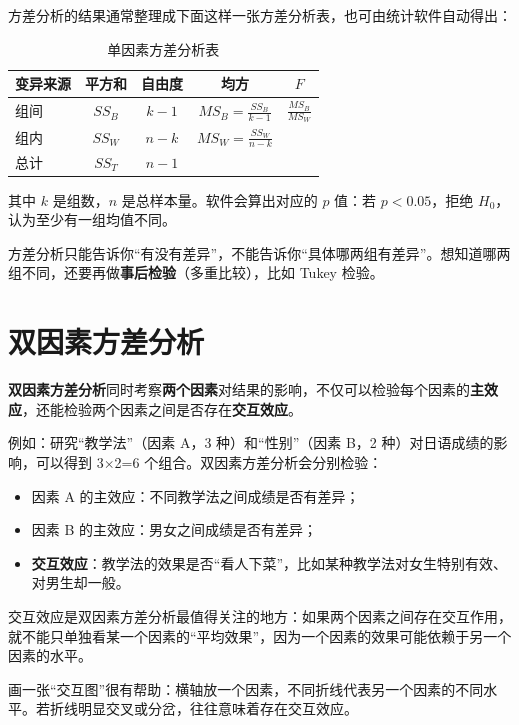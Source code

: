 \documentclass[lang=cn,10pt]{elegantbook}
\begin{document}
方差分析的结果通常整理成下面这样一张方差分析表，也可由统计软件自动得出：

\begin{table}[H]
  \centering
  \caption{单因素方差分析表}
  \begin{tabular}{lcccc}
    \toprule
    变异来源 & 平方和 & 自由度 & 均方 & $F$ \\
    \midrule
    组间 & $SS_B$ & $k-1$ & $MS_B=\frac{SS_B}{k-1}$ & $\frac{MS_B}{MS_W}$ \\
    组内 & $SS_W$ & $n-k$ & $MS_W=\frac{SS_W}{n-k}$ & \\
    总计 & $SS_T$ & $n-1$ & & \\
    \bottomrule
  \end{tabular}
\end{table}

其中 $k$ 是组数，$n$ 是总样本量。软件会算出对应的 $p$ 值：若 $p<0.05$，拒绝 $H_0$，认为至少有一组均值不同。

\begin{remark}
方差分析只能告诉你“有没有差异”，不能告诉你“具体哪两组有差异”。想知道哪两组不同，还要再做\textbf{事后检验}（多重比较），比如 Tukey 检验。
\end{remark}

\section{双因素方差分析}
\textbf{双因素方差分析}同时考察\textbf{两个因素}对结果的影响，不仅可以检验每个因素的\textbf{主效应}，还能检验两个因素之间是否存在\textbf{交互效应}。

例如：研究“教学法”（因素 A，3 种）和“性别”（因素 B，2 种）对日语成绩的影响，可以得到 3$\times$2=6 个组合。双因素方差分析会分别检验：
\begin{itemize}
  \item 因素 A 的主效应：不同教学法之间成绩是否有差异；
  \item 因素 B 的主效应：男女之间成绩是否有差异；
  \item \textbf{交互效应}：教学法的效果是否“看人下菜”，比如某种教学法对女生特别有效、对男生却一般。
\end{itemize}

交互效应是双因素方差分析最值得关注的地方：如果两个因素之间存在交互作用，就不能只单独看某一个因素的“平均效果”，因为一个因素的效果可能依赖于另一个因素的水平。

\begin{remark}
画一张“交互图”很有帮助：横轴放一个因素，不同折线代表另一个因素的不同水平。若折线明显交叉或分岔，往往意味着存在交互效应。
\end{remark}
\end{document}
